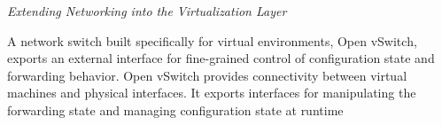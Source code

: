 \noindent \emph{Extending Networking into the Virtualization Layer}

A network switch built specifically for virtual environments, Open vSwitch,
exports an external interface
for fine-grained control of configuration state and forwarding behavior. Open
vSwitch provides
connectivity between virtual machines and physical interfaces. It exports
interfaces for manipulating
the forwarding state and managing configuration state at runtime  
\cite{Pfaff2009} \\




